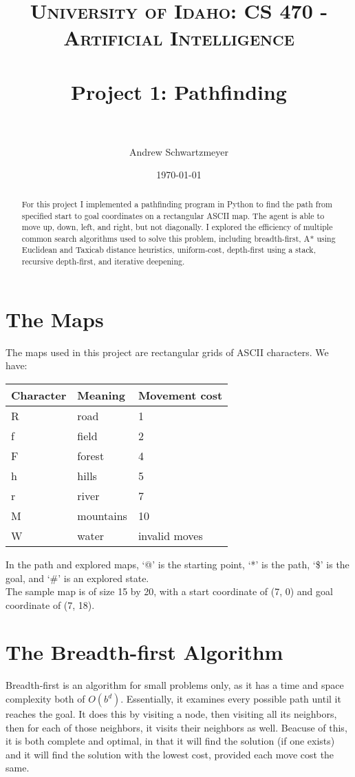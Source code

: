 \documentclass[12pt, article]{scrartcl}
\title{	
\normalfont \normalsize 
\textsc{University of Idaho: CS 470 - Artificial Intelligence} \\ [25pt]
\horrule{0.5pt} \\[0.4cm]
\huge Project 1: Pathfinding\\
\horrule{2pt} \\[0.5cm]
}
\author{Andrew Schwartzmeyer}
\date{\normalsize\today}
\begin{document}
\maketitle %
\begin{abstract}
For this project I implemented a pathfinding program in Python to find the path from specified start to goal coordinates on a rectangular ASCII map. The agent is able to move up, down, left, and right, but not diagonally. I explored the efficiency of multiple common search algorithms used to solve this problem, including breadth-first, A* using Euclidean and Taxicab distance heuristics, uniform-cost, depth-first using a stack, recursive depth-first, and iterative deepening.
\end{abstract}
\pagebreak
\section{The Maps}
The maps used in this project are rectangular grids of ASCII characters. We have:
\begin{center}
\begin{tabular}{l | l | l}
Character & Meaning & Movement cost \\ \hline
R & road & 1 \\
f & field & 2 \\
F & forest & 4 \\
h & hills & 5 \\
r & river & 7 \\
M & mountains & 10 \\
W & water & invalid moves \\
\end{tabular}
\end{center}

In the path and explored maps, `@' is the starting point, `*' is the path, `\$' is the goal, and `\#' is an explored state. \\ 

The sample map is of size 15 by 20, with a start coordinate of (7, 0) and goal coordinate of (7, 18). \\

\section{The Breadth-first Algorithm}
Breadth-first is an algorithm for small problems only, as it has a time and space complexity both of $O(b^{d})$. Essentially, it examines every possible path until it reaches the goal. It does this by visiting a node, then visiting all its neighbors, then for each of those neighbors, it visits their neighbors as well. Beacuse of this, it is both complete and optimal, in that it will find the solution (if one exists) and it will find the solution with the lowest cost, provided each move cost the same. \\
\end{document}
